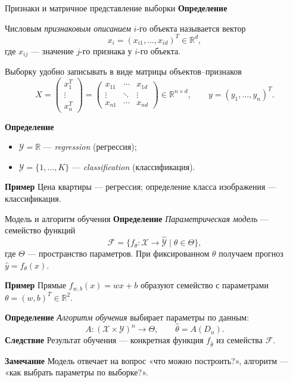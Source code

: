 \documentclass[10pt]{beamer}
\newcommand{\mlBody}{\normalsize}
\newcommand{\mlDefinition}{\textcolor{defblue}{\bfseries Определение}}
\newcommand{\mlRemark}{\textcolor{defblue}{\bfseries Замечание}}
\newcommand{\mlConsequence}{\textcolor{defblue}{\bfseries Следствие}}
\newcommand{\mlExample}{\textcolor{defblue}{\bfseries Пример}}
\begin{document}
\begin{frame}{Признаки и матричное представление выборки}
    \mlBody
    \mlDefinition

    Числовым \textit{признаковым описанием} $i$-го объекта называется вектор
    \[
        x_i=
        (x_{i1},\ldots,x_{id})^T\in\mathbb R^d,
    \]
    где $x_{ij}$ --- значение $j$-го признака у $i$-го объекта.

    Выборку удобно записывать в виде матрицы объектов--признаков
    \[
        X=
        \begin{pmatrix}
        x_1^T\\
        \vdots\\
        x_n^T
        \end{pmatrix}
        =
        \begin{pmatrix}
        x_{11}&\cdots&x_{1d}\\
        \vdots&\ddots&\vdots\\
        x_{n1}&\cdots&x_{nd}
        \end{pmatrix}
        \in\mathbb R^{n\times d},
        \qquad
        y=(y_1,\ldots,y_n)^T.
    \]

    \mlDefinition

    \begin{itemize}
        \item $\mathcal Y=\mathbb R$ --- \textit{regression} (регрессия);
        \item $\mathcal Y=\{1,\ldots,K\}$ --- \textit{classification} (классификация).
    \end{itemize}

    \mlExample\;
    Цена квартиры --- регрессия; определение класса изображения --- классификация.
\end{frame}

\begin{frame}{Модель и алгоритм обучения}
\mlBody
\mlDefinition\; \textit{Параметрическая модель} --- семейство функций
\[
 \mathcal F=\{f_\theta:\mathcal X\to\widehat{\mathcal Y}\mid\theta\in\Theta\},
\]
где $\Theta$ --- пространство параметров. При фиксированном $\theta$
получаем прогноз $\hat y=f_\theta(x)$.

\mlExample\; Прямые $f_{w,b}(x)=wx+b$ образуют семейство
с параметрами $\theta=(w,b)^T\in\mathbb R^2$.

\mlDefinition\; \textit{Алгоритм обучения} выбирает параметры по данным:
\[
 \boxed{A:(\mathcal X\times\mathcal Y)^n\to\Theta,\qquad
 \hat\theta=A(D_n)}.
\]
\mlConsequence\; Результат обучения --- конкретная функция
$f_{\hat\theta}$ из семейства $\mathcal F$.

\mlRemark\; Модель отвечает на вопрос «что можно построить?»,
алгоритм --- «как выбрать параметры по выборке?».
\end{frame}
\end{document}
